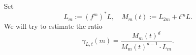   Set 
  \[ L_m := (f^m)^* L, \quad M_m(t) := L_{2m} + t^m L. \]
  We will try to estimate the ratio
  \[ \gamma_{L,t}(m) = \frac{M_m(t)^{d}}{M_m(t)^{d-1} \cdot L_m}. \]

















